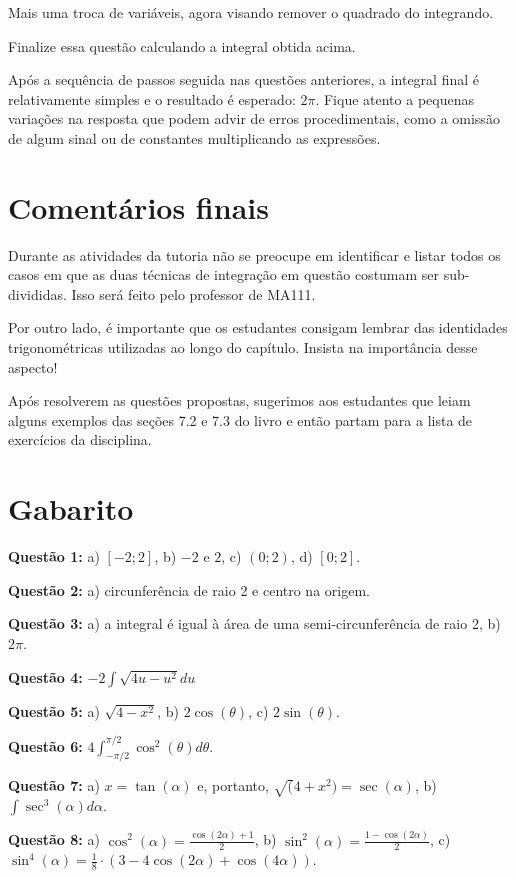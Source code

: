 \documentclass[main_estudante.tex]{subfiles}
\begin{document}
Mais uma troca de variáveis, agora visando remover o quadrado do integrando.

\begin{questao}
Finalize essa questão calculando a integral obtida acima.
\end{questao}

Após a sequência de passos seguida nas questões anteriores, a integral final é relativamente simples e o resultado é esperado: $2\pi$. Fique atento a pequenas variações na resposta que podem advir de erros procedimentais, como a omissão de algum sinal ou de constantes multiplicando as expressões.

\section{Comentários finais}

Durante as atividades da tutoria não se preocupe em identificar e listar todos os casos em que as duas técnicas de integração em questão costumam ser sub-divididas. Isso será feito pelo professor de MA111. 

Por outro lado, é importante que os estudantes consigam lembrar das identidades trigonométricas utilizadas ao longo do capítulo. Insista na importância desse aspecto!

Após resolverem as questões propostas, sugerimos aos estudantes que leiam alguns exemplos das seções 7.2 e 7.3 do livro  e então partam para a lista de exercícios da disciplina.

\section{Gabarito}

\noindent\textbf{Questão 1:} a) $[-2;2]$, b) $-2$ e $2$, c) $(0;2)$, d) $[0;2]$.

\noindent\textbf{Questão 2:} a) circunferência de raio 2 e centro na origem.

\noindent\textbf{Questão 3:} a) a integral é igual à área de uma semi-circunferência de raio 2, b) $2\pi$.

\noindent\textbf{Questão 4:} $-2\int\sqrt{4u-u^2}du$

\noindent\textbf{Questão 5:} a) $\sqrt{4-x^2}$, b) $2\cos(\theta)$, c) $2\sin(\theta)$.

\noindent\textbf{Questão 6:} $4 \int_{-\pi/2}^{\pi/2} \cos^2(\theta)d\theta$.

\noindent\textbf{Questão 7:} a) $x=\tan(\alpha)$ e, portanto, $\sqrt(4+x^2)=\sec(\alpha)$, b) $\int \sec^3(\alpha)d\alpha$.

\noindent\textbf{Questão 8:} a) $\cos^2(\alpha)=\frac{\cos(2\alpha)+1}{2}$, b) $\sin^2(\alpha)=\frac{1-\cos(2\alpha)}{2}$, c) $\sin^4(\alpha)=\frac{1}{8} \cdot (3-4\cos(2\alpha)+\cos(4\alpha))$.
\end{document}
